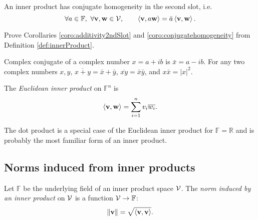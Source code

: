 \begin{coro}
  \label{coro:conjugatehomogeneity}
  An inner product has conjugate homogeneity
  in the second slot,
  i.e.
  \begin{equation}
    \label{eq:conjugatehomogeneity}
    \forall a\in \mathbb{F},\ 
    \forall \mathbf{v},\mathbf{w}\in{\cal V},\qquad 
    \innerProd{\mathbf{v},a\mathbf{w}}
    = \bar{a}\innerProd{\mathbf{v},\mathbf{w}}.
  \end{equation}
\end{coro}

\begin{exc}
  Prove Corollaries \ref{coro:additivity2ndSlot}
  and \ref{coro:conjugatehomogeneity}
  from Definition \ref{def:innerProduct}.
\end{exc}
\begin{solution}
  Complex conjugate of a complex number $x=a+ib$
  is $\bar{x}=a-ib$.
  For any two complex numbers $x,y$, $\overline{x+y}=\bar{x}+\bar{y}$,
  $\overline{xy}=\bar{x}\bar{y}$,
  and $x\bar{x}=|x|^2$.
\end{solution}

\begin{defn}
  \label{def:EuclideanInnerProduct}
  The \emph{Euclidean inner product} on $\mathbb{F}^n$ is 
  \begin{equation}
    \label{eq:EuclideanInnerProduct}
    \left\langle \mathbf{v},\mathbf{w} \right\rangle = \sum_{i=1}^n v_i\overline{w_i}.
  \end{equation}
\end{defn}

\begin{rem}
  The dot product is a special case of
  the Euclidean inner product for $\mathbb{F}=\mathbb{R}$
  and is probably the most familiar form of an inner product.
\end{rem}

\subsection{Norms induced from inner products}
\label{sec:norms-induced-from}

\begin{defn}
  \label{def:inducedNorm}
  Let $\mathbb{F}$ be the underlying field of
  an inner product space ${\cal V}$.
  The \emph{norm induced by an inner product} on ${\cal V}$
  is a function ${\cal V}\rightarrow\mathbb{F}$:
  \begin{equation}
    \label{eq:inducedNorm}
    \|\mathbf{v}\|=\sqrt{\left\langle \mathbf{v},\mathbf{v} \right\rangle}.
  \end{equation}
\end{defn}

